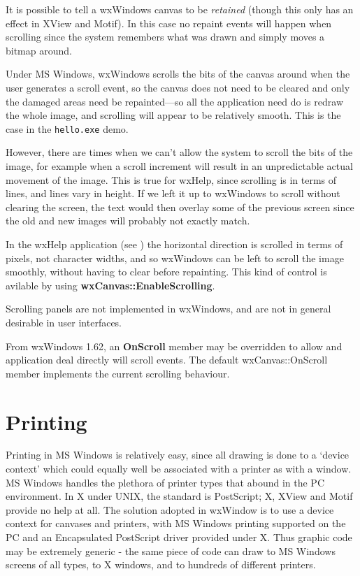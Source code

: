 It is possible to tell a wxWindows canvas to be {\it retained} (though
this only has an effect in XView and Motif). In this case no repaint events will happen
when scrolling since the system remembers what was drawn and simply moves
a bitmap around.

Under MS Windows, wxWindows scrolls the bits of the canvas around
when the user generates a scroll event, so the canvas does not need to
be cleared and only the damaged areas need be repainted---so all the
application need do is redraw the whole image, and scrolling will appear to be
relatively smooth. This is the case in the {\tt hello.exe} demo.

However, there are times when we can't allow the system to scroll the
bits of the image, for example when a scroll increment will result in
an unpredictable actual movement of the image. This is true for wxHelp, since
scrolling is in terms of lines, and lines vary in height. If we left
it up to wxWindows to scroll without clearing the screen, the text
would then overlay some of the previous screen since the old and new
images will probably not exactly match.

In the wxHelp application (see ) the horizontal
direction is scrolled in terms of pixels, not character widths, and so
wxWindows can be left to scroll the image smoothly, without having to
clear before repainting. This kind of control is avilable by using {\bf
wxCanvas::EnableScrolling}.

Scrolling panels are not implemented in wxWindows, and are not in general
desirable in user interfaces.

From wxWindows 1.62, an {\bf OnScroll} member may be overridden to allow
and application deal directly will scroll events. The default wxCanvas::OnScroll
member implements the current scrolling behaviour.

\section{Printing}

Printing in MS Windows is relatively easy, since all drawing is done to
a `device context' which could equally well be associated with a
printer as with a window. MS Windows handles the plethora of printer
types that abound in the PC environment. In X under UNIX, the standard
is PostScript; X, XView and Motif provide no help at all. The solution
adopted in wxWindow is to use a device context for canvases and
printers, with MS Windows printing supported on the PC and an
Encapsulated PostScript driver provided under X. Thus graphic code may
be extremely generic - the same piece of code can draw to MS Windows
screens of all types, to X windows, and to hundreds of different
printers.

